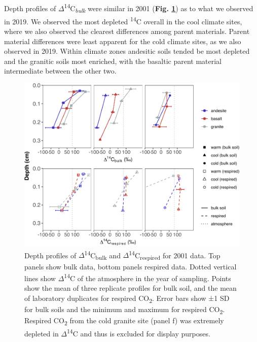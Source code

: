 \documentclass[english,man,floatsintext]{apa6}
\begin{document}
Depth profiles of \(\Delta\)\textsuperscript{14}C\textsubscript{\emph{bulk}} were similar in 2001 (\textbf{Fig. \ref{fig:plot-d14c-pro-01}}) as to what we observed in 2019. We observed the most depleted \textsuperscript{14}C overall in the cool climate sites, where we also observed the clearest differences among parent materials. Parent material differences were least apparent for the cold climate sites, as we also observed in 2019. Within climate zones andesitic soils tended be most depleted and the granitic soils most enriched, with the basaltic parent material intermediate between the other two.



\begin{figure}

{\centering \includegraphics{sra-blk-inc-SI_files/figure-latex/plot-d14c-pro-01-1} 

}

\caption{Depth profiles of \(\Delta\)\textsuperscript{14}C\textsubscript{bulk} and \(\Delta\)\textsuperscript{14}C\textsubscript{respired} for 2001 data. Top panels show bulk data, bottom panels respired data. Dotted vertical lines show \(\Delta\)\textsuperscript{14}C of the atmosphere in the year of sampling. Points show the mean of three replicate profiles for bulk soil, and the mean of laboratory duplicates for respired CO\textsubscript{2}. Error bars show ±1 SD for bulk soils and the minimum and maximum for respired CO\textsubscript{2}. Respired CO\textsubscript{2} from the cold granite site (panel f) was extremely depleted in \(\Delta\)\textsuperscript{14}C and thus is excluded for display purposes.}\label{fig:plot-d14c-pro-01}
\end{figure}
\end{document}
